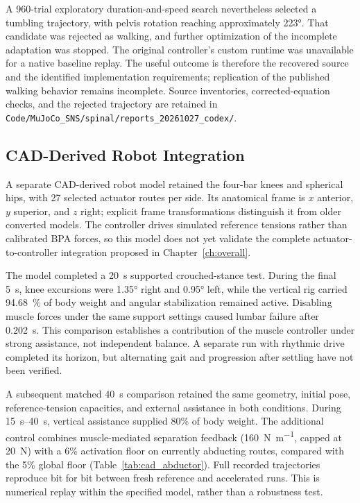 A 960-trial exploratory duration-and-speed search nevertheless selected a tumbling trajectory, with pelvis rotation reaching approximately \ang{223}. That candidate was rejected as walking, and further optimization of the incomplete adaptation was stopped. The original controller's custom runtime was unavailable for a native baseline replay. The useful outcome is therefore the recovered source and the identified implementation requirements; replication of the published walking behavior remains incomplete. Source inventories, corrected-equation checks, and the rejected trajectory are retained in \nolinkurl{Code/MuJoCo_SNS/spinal/reports_20261027_codex/}.

\subsection{CAD-Derived Robot Integration}\label{sec:app_cad_supported_stance}

A separate CAD-derived robot model retained the four-bar knees and spherical hips, with 27 selected actuator routes per side. Its anatomical frame is $x$ anterior, $y$ superior, and $z$ right; explicit frame transformations distinguish it from older converted models. The controller drives simulated reference tensions rather than calibrated BPA forces, so this model does not yet validate the complete actuator-to-controller integration proposed in Chapter~\ref{ch:overall}.

The model completed a \qty{20}{\second} supported crouched-stance test. During the final \qty{5}{\second}, knee excursions were \ang{1.35} right and \ang{0.95} left, while the vertical rig carried \qty{94.68}{\percent} of body weight and angular stabilization remained active. Disabling muscle forces under the same support settings caused lumbar failure after \qty{0.202}{\second}. This comparison establishes a contribution of the muscle controller under strong assistance, not independent balance. A separate run with rhythmic drive completed its horizon, but alternating gait and progression after settling have not been verified.

A subsequent matched \qty{40}{\second} comparison retained the same geometry, initial pose, reference-tension capacities, and external assistance in both conditions. During \qtyrange{15}{40}{\second}, vertical assistance supplied 80\% of body weight. The additional control combines muscle-mediated separation feedback (\qty{160}{\newton\per\meter}, capped at \qty{20}{\newton}) with a 6\% activation floor on currently abducting routes, compared with the 5\% global floor (Table~\ref{tab:cad_abductor}). Full recorded trajectories reproduce bit for bit between fresh reference and accelerated runs. This is numerical replay within the specified model, rather than a robustness test.

